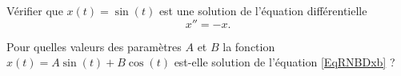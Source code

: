
\begin{exercice}\label{exoSVT-0004}

    Vérifier que \( x(t)=\sin(t)\) est une solution de l'équation différentielle
    \begin{equation}    \label{EqRNBDxb}
        x''=-x.
    \end{equation}
    
    Pour quelles valeurs des paramètres \( A\) et \( B\) la fonction \( x(t)=A\sin(t)+B\cos(t)\) est-elle solution de l'équation \eqref{EqRNBDxb} ?

\end{exercice}
